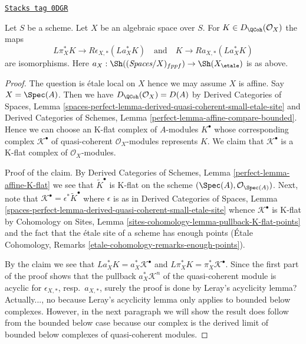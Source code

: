 \begin{lemma}
\label{spaces-more-cohomology-lemma-cohomological-descent-etale-fppf-modules-unbounded}
\href{https://stacks.math.columbia.edu/tag/0DGR}{\texttt{Stacks tag 0DGR}}

Let $S$ be a scheme. Let $X$ be an algebraic space over $S$.
For $K \in D_\QCoh(\mathcal{O}_X)$ the maps
$$
L\pi_X^*K \longrightarrow R\epsilon_{X, *}(La_X^*K)
\quad\text{and}\quad
K \longrightarrow Ra_{X, *}(La_X^*K)
$$
are isomorphisms. Here
$a_X : \Sh((\textit{Spaces}/X)_{fppf}) \to \Sh(X_\etale)$ is as above.
\end{lemma}

\begin{proof}
The question is \'etale local on $X$ hence we may assume $X$ is affine.
Say $X = \Spec(A)$. Then we have $D_\QCoh(\mathcal{O}_X) = D(A)$ by
Derived Categories of Spaces, Lemma
\ref{spaces-perfect-lemma-derived-quasi-coherent-small-etale-site}
and
Derived Categories of Schemes, Lemma
\ref{perfect-lemma-affine-compare-bounded}.
Hence we can choose an K-flat complex of $A$-modules
$K^\bullet$ whose corresponding complex
$\mathcal{K}^\bullet$ of quasi-coherent $\mathcal{O}_X$-modules
represents $K$.
We claim that $\mathcal{K}^\bullet$ is a K-flat complex
of $\mathcal{O}_X$-modules.

\medskip\noindent
Proof of the claim. By
Derived Categories of Schemes, Lemma
\ref{perfect-lemma-affine-K-flat}
we see that $\widetilde{K}^\bullet$ is K-flat on the scheme
$(\Spec(A), \mathcal{O}_{\Spec(A)})$.
Next, note that $\mathcal{K}^\bullet = \epsilon^*\widetilde{K}^\bullet$
where $\epsilon$ is as in Derived Categories of Spaces, Lemma
\ref{spaces-perfect-lemma-derived-quasi-coherent-small-etale-site}
whence $\mathcal{K}^\bullet$ is K-flat by
Cohomology on Sites, Lemma \ref{sites-cohomology-lemma-pullback-K-flat-points}
and the fact that the \'etale site of a scheme has enough points
(\'Etale Cohomology, Remarks \ref{etale-cohomology-remarks-enough-points}).

\medskip\noindent
By the claim we see that
$La_X^*K = a_X^*\mathcal{K}^\bullet$ and
$L\pi_X^*K = \pi_X^*\mathcal{K}^\bullet$.
Since the first part of the proof shows that the pullback
$a_X^*\mathcal{K}^n$ of the quasi-coherent module
is acyclic for $\epsilon_{X, *}$, resp.\ $a_{X, *}$, surely the proof is done
by Leray's acyclicity lemma? Actually..., no because Leray's
acyclicity lemma only applies to bounded below complexes.
However, in the next paragraph we will show the result does follow
from the bounded below case because our complex is the derived limit
of bounded below complexes of quasi-coherent modules.


\end{proof}
